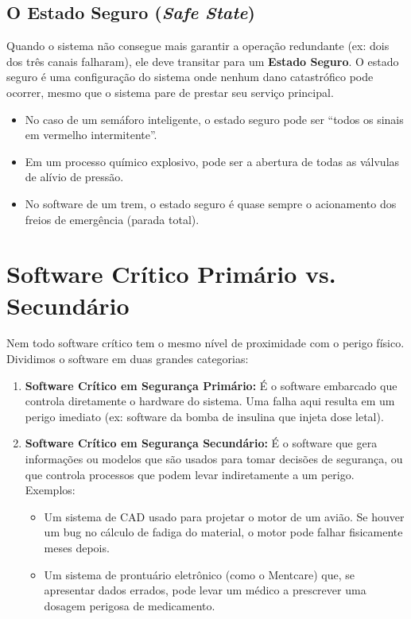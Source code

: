 \documentclass[12pt,a4paper]{report}
\begin{document}
\subsection{O Estado Seguro (\textit{Safe State})}
Quando o sistema não consegue mais garantir a operação redundante (ex: dois dos três canais falharam), ele deve transitar para um \textbf{Estado Seguro}. O estado seguro é uma configuração do sistema onde nenhum dano catastrófico pode ocorrer, mesmo que o sistema pare de prestar seu serviço principal.
\begin{itemize}
    \item No caso de um semáforo inteligente, o estado seguro pode ser ``todos os sinais em vermelho intermitente''.
    \item Em um processo químico explosivo, pode ser a abertura de todas as válvulas de alívio de pressão.
    \item No software de um trem, o estado seguro é quase sempre o acionamento dos freios de emergência (parada total).
\end{itemize}

\section{Software Crítico Primário vs. Secundário}

Nem todo software crítico tem o mesmo nível de proximidade com o perigo físico. Dividimos o software em duas grandes categorias:

\begin{enumerate}
    \item \textbf{Software Crítico em Segurança Primário:} É o software embarcado que controla diretamente o hardware do sistema. Uma falha aqui resulta em um perigo imediato (ex: software da bomba de insulina que injeta dose letal).
    \item \textbf{Software Crítico em Segurança Secundário:} É o software que gera informações ou modelos que são usados para tomar decisões de segurança, ou que controla processos que podem levar indiretamente a um perigo. Exemplos:
    \begin{itemize}
        \item Um sistema de CAD usado para projetar o motor de um avião. Se houver um bug no cálculo de fadiga do material, o motor pode falhar fisicamente meses depois.
        \item Um sistema de prontuário eletrônico (como o Mentcare) que, se apresentar dados errados, pode levar um médico a prescrever uma dosagem perigosa de medicamento.
    \end{itemize}
\end{enumerate}
\end{document}
